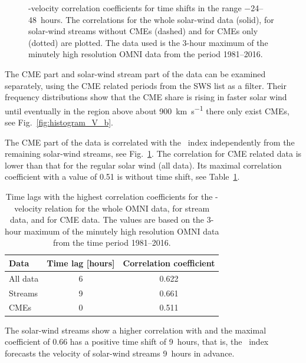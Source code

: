 \begin{figure}[htb]
\begin{floatrow}
{		}{
			\caption{\Kp{}-velocity correlation coefficients for time shifts in the range \numrange{-24}{48}~hours. The correlations for the whole solar-wind data (solid), for solar-wind streams without CMEs (dashed) and for CMEs only (dotted) are plotted. The data used is the 3-hour maximum of the minutely high resolution OMNI data from the period 1981--2016.}
			\label{fig:cc_lag_sws_d}
		}
	\end{floatrow}
\end{figure}
The CME part and solar-wind stream part of the data can be examined separately, using the CME related periods from the SWS list as a filter. Their frequency distributions show that the CME share is rising in faster solar wind until eventually in the region above about \SI{900}{\km\per\s} there only exist CMEs, see Fig.~\ref{fig:histogram_V_b}.

The CME part of the data is correlated with the \Kp~index independently from the remaining solar-wind streams, see Fig.~\ref{fig:cc_lag_sws_d}. The correlation for CME related data is lower than that for the regular solar wind (all data). Its maximal correlation coefficient with a value of 0.51 is without time shift, see Table~\ref{tab:correlation_coefficients_kpvsv}.
\begin{table}
	\caption{Time lags with the highest correlation coefficients for the \Kp{}-velocity relation for the whole OMNI data, for stream data, and for CME data. The values are based on the 3-hour maximum of the minutely high resolution OMNI data from the time period 1981--2016.}
	\label{tab:correlation_coefficients_kpvsv}
	\centering
	\begin{tabular}{lcc}
		\hline\hline
		Data	&Time lag [hours]	&Correlation coefficient\\
		\hline
		All data	&6	&0.622\\
		Streams	&9	&0.661\\
		CMEs	&0	&0.511\\
		\hline
	\end{tabular}
\end{table}
% 
The solar-wind streams show a higher correlation with \Kp{} and the maximal coefficient of 0.66 has a positive time shift of 9~hours, that is, the \Kp~index forecasts the velocity of solar-wind streams 9~hours in advance.

